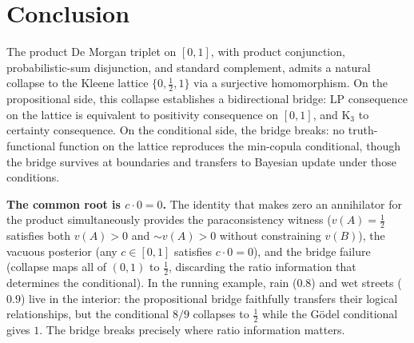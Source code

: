 \documentclass[11pt,a4paper]{article}
\newcommand{\negc}{\mathord{\sim}}
\begin{document}
\section{Conclusion}
\label{sec:conclusion}

The product De Morgan triplet on $[0,1]$, with product conjunction,
probabilistic-sum disjunction, and standard complement, admits a
natural collapse to the Kleene lattice
$\{0, \tfrac{1}{2}, 1\}$ via a surjective homomorphism.
On the propositional side, this collapse establishes a bidirectional
bridge: LP consequence on the lattice is equivalent to positivity
consequence on $[0,1]$, and K$_3$ to certainty consequence.
On the conditional side, the bridge breaks: no truth-functional
function on the lattice reproduces the min-copula conditional,
though the bridge survives at boundaries and transfers to Bayesian
update under those conditions.

\textbf{The common root is $c \cdot 0 = 0$.}
The identity that makes zero an annihilator for the product
simultaneously provides the paraconsistency witness
($v(A) = \tfrac{1}{2}$ satisfies both $v(A) > 0$ and
$\negc v(A) > 0$ without constraining $v(B)$),
the vacuous posterior (any $c \in [0,1]$ satisfies
$c \cdot 0 = 0$), and the bridge failure (collapse maps
all of $(0,1)$ to $\tfrac{1}{2}$, discarding the ratio
information that determines the conditional).
In the running example, rain ($0.8$) and wet streets ($0.9$) live
in the interior: the propositional bridge faithfully transfers their
logical relationships, but the conditional $8/9$ collapses to
$\tfrac{1}{2}$ while the G\"odel conditional gives $1$. The
bridge breaks precisely where ratio information matters.
\end{document}
